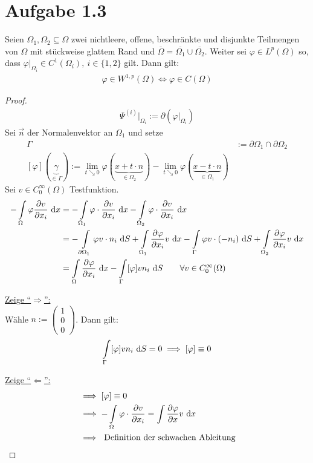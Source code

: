 \documentclass[12pt,a4paper]{article}
\begin{document}
\section*{Aufgabe 1.3}
Seien $\Omega_1,\Omega_2\subseteq\Omega$ zwei nichtleere, offene, beschränkte und disjunkte Teilmengen von $\Omega$ mit stückweise glattem Rand und $\overline{\Omega}=\overline{\Omega_1}\cup\overline{\Omega_2}$. Weiter sei $\varphi\in L^p(\Omega)$ so, dass $\varphi|_{\Omega_i}\in C^1(\Omega_i),~i\in\lbrace1,2\rbrace$ gilt. Dann gilt:
\begin{align*}
\varphi\in W^{1,p}(\Omega)\Longleftrightarrow\varphi\in C(\Omega)
\end{align*}
\begin{proof}
\begin{align*}
\Psi^{(i)}|_{\Omega_i}:=\partial\left(\varphi|_{\Omega_i}\right)
\end{align*}
Sei $\vec{n}$ der Normalenvektor an $\Omega_1$ und setze
\begin{align*}
\Gamma&:=\partial\Omega_1\cap\partial\Omega_2\\
[\varphi](\underbrace{\gamma}_{\in\Gamma}):=\lim\limits_{t\searrow 0}\varphi(\underbrace{x+t\cdot n}_{\in\Omega_2})-\lim\limits_{t\searrow0}\varphi(\underbrace{x-t\cdot n}_{\in\Omega_1})
\end{align*}
Sei $v\in C_0^\infty(\Omega)$ Testfunktion.
\begin{align*}
-\int\limits_\Omega\varphi\frac{\partial v}{\partial x_i}\text{ d} x
&=-\int\limits_{\Omega_1}\varphi\cdot\frac{\partial v}{\partial x_i}\text{ d} x
-\int\limits_{\Omega_2}\varphi\cdot\frac{\partial v}{\partial x_i}\text{ d} x\\
&=-\int\limits_{\partial\Omega_1}\varphi v\cdot n_i\text{ d} S+\int\limits_{\Omega_1}\frac{\partial\varphi}{\partial x_i}v\text{ d} x
-\int\limits_{\Gamma}\varphi v\cdot(-n_i)\text{ d} S+\int\limits_{\Omega_2}\frac{\partial\varphi}{\partial x_i}v\text{ d} x\\
&=\int\limits_\Omega\frac{\partial\varphi}{\partial x_i}\text{ d} x-\int\limits_\Gamma[\varphi] v n_i\text{ d} S\qquad\forall v\in C_0^\infty(\Omega)
\end{align*}

\underline{Zeige ``$\Rightarrow$'':}\\
Wähle $n:=\begin{pmatrix}
1\\ 0\\0
\end{pmatrix}$. Dann gilt:
\begin{align*}
\int\limits_\Gamma[\varphi] v n_i\text{ d} S=0\implies[\varphi]\equiv0
\end{align*}

\underline{Zeige ``$\Leftarrow$'':}\\
\begin{align*}
&\implies[\varphi]\equiv0\\
&\implies -\int\limits_\Omega\varphi\cdot\frac{\partial v}{\partial x_i}
=\int\limits \frac{\partial\varphi}{\partial x}v\text{ d} x\\
&\implies\text{ Definition der schwachen Ableitung}
\end{align*}

\end{proof}
\end{document}
